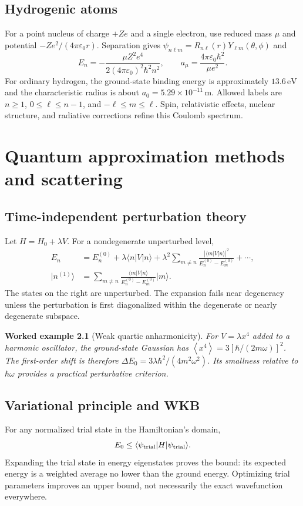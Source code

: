 \documentclass[11pt,oneside]{book}
\newcommand{\avg}[1]{\left\langle #1\right\rangle}
\newcommand{\ket}[1]{\lvert #1\rangle}
\newcommand{\bra}[1]{\langle #1\rvert}
\newcommand{\eps}{\varepsilon_0}
\theoremstyle{reviewstyle}
\newtheorem{example}{Worked example}[chapter]
\begin{document}
\section{Hydrogenic atoms}
For a point nucleus of charge $+Ze$ and a single electron, use reduced mass $\mu$ and potential $-Ze^2/(4\pi\eps r)$. Separation gives $\psi_{n\ell m}=R_{n\ell}(r)Y_{\ell m}(\theta,\phi)$ and
\begin{equation}E_n=-\frac{\mu Z^2e^4}{2(4\pi\eps)^2\hbar^2n^2},\qquad a_\mu=\frac{4\pi\eps\hbar^2}{\mu e^2}.\end{equation}
For ordinary hydrogen, the ground-state binding energy is approximately $13.6\,\mathrm{eV}$ and the characteristic radius is about $a_0=5.29\times10^{-11}\,\mathrm m$. Allowed labels are $n\geq1$, $0\leq\ell\leq n-1$, and $-\ell\leq m\leq\ell$. Spin, relativistic effects, nuclear structure, and radiative corrections refine this Coulomb spectrum.

\chapter{Quantum approximation methods and scattering}
\section{Time-independent perturbation theory}
Let $H=H_0+\lambda V$. For a nondegenerate unperturbed level,
\begin{align}
E_n&=E_n^{(0)}+\lambda\bra n V\ket n+
\lambda^2\sum_{m\neq n}\frac{|\bra m V\ket n|^2}{E_n^{(0)}-E_m^{(0)}}+\cdots,\\
\ket{n^{(1)}}&=\sum_{m\neq n}\frac{\bra m V\ket n}{E_n^{(0)}-E_m^{(0)}}\ket m.
\end{align}
The states on the right are unperturbed. The expansion fails near degeneracy unless the perturbation is first diagonalized within the degenerate or nearly degenerate subspace.
\begin{example}[Weak quartic anharmonicity]
For $V=\lambda x^4$ added to a harmonic oscillator, the ground-state Gaussian has $\avg{x^4}=3[\hbar/(2m\omega)]^2$. The first-order shift is therefore $\Delta E_0=3\lambda\hbar^2/(4m^2\omega^2)$. Its smallness relative to $\hbar\omega$ provides a practical perturbative criterion.
\end{example}
\section{Variational principle and WKB}
For any normalized trial state in the Hamiltonian's domain,
\begin{equation}E_0\leq\bra{\psi_{\rm trial}}H\ket{\psi_{\rm trial}}.\end{equation}
Expanding the trial state in energy eigenstates proves the bound: its expected energy is a weighted average no lower than the ground energy. Optimizing trial parameters improves an upper bound, not necessarily the exact wavefunction everywhere.
\end{document}
